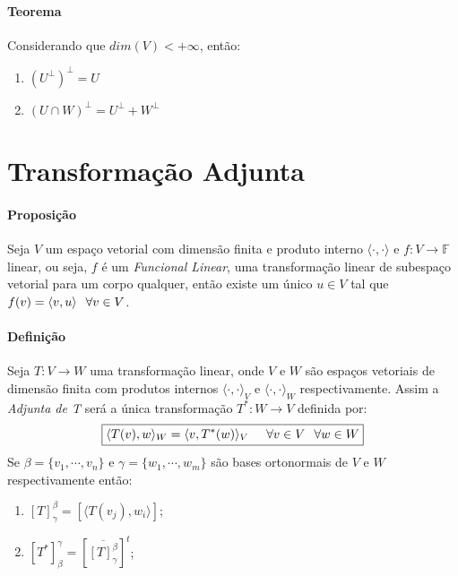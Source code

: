 \documentclass{article}
\begin{document}
            \paragraph{Teorema}Considerando que $dim(V) < +\infty$, então:
                \begin{enumerate}[noitemsep]
                    \item $(U^{\bot})^{\bot} = U$
                    \item $(U \cap W)^{\bot} = U^{\bot} + W^{\bot}$
                \end{enumerate}
\newpage

    \section{Transformação Adjunta}
        \paragraph{Proposição}Seja $V$ um espaço vetorial com dimensão finita e produto interno $\langle\cdot,\cdot\rangle$ e $f: V \rightarrow \mathbb{F}$ linear, ou seja, $f$ é um \textit{Funcional Linear}, uma transformação linear de subespaço vetorial para um corpo qualquer, então existe um único $u \in V$ tal que $f(v) = \langle v, u\rangle \hspace{2.5mm} \forall v \in V$.

        \paragraph{Definição}Seja $T: V \rightarrow W$ uma transformação linear, onde $V$ e $W$ são espaços vetoriais de dimensão finita com produtos internos $\langle\cdot,\cdot\rangle_{V}$ e $\langle\cdot,\cdot\rangle_{W}$ respectivamente. Assim a \textit{Adjunta de T} será a única transformação $T^{*}: W \rightarrow V$ definida por:
            \[\boxed{\langle T(v), w\rangle_{W} = \langle v, T^{*}(w)\rangle_{V} \hspace{5mm} \forall v\in V \hspace{2.5mm} \forall w\in W}\]
        Se $\beta = \{v_{1}, \cdots, v_{n}\}$ e $\gamma = \{w_{1}, \cdots, w_{m}\}$ são bases ortonormais de $V$ e $W$ respectivamente então:
            \begin{enumerate}[noitemsep]
                \item $[T]_{\gamma}^{\beta} = \left[\langle T(v_{j}), w_{i} \rangle\right]$; 
                \item $[T^{*}]_{\beta}^{\gamma} = \left[\overline{[T]_{\gamma}^{\beta}}\right]^{t}$;
            \end{enumerate}
\end{document}
